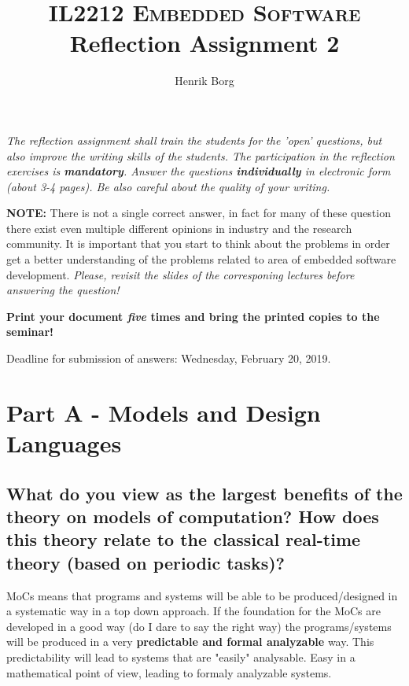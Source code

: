 \documentclass[10pt]{article}
\title{{\normalsize\textsc {IL2212 Embedded Software}} \\ Reflection Assignment 2}
\author{Henrik Borg}
\begin{document}
\maketitle
\thispagestyle{fancy} %

{\em The reflection assignment shall train the students for the 'open' questions, but also improve the writing skills of the students. The participation in the reflection exercises is \textbf{mandatory}. Answer the questions \textbf{individually} in electronic form (about 3-4 pages). Be also careful about the quality of your writing. }

\medskip

\noindent\textbf{NOTE:} There is not a single correct answer, in fact
for many of these question there exist even multiple different opinions
in industry and the research community. It is important that you start
to think about the problems in order get a better understanding of the
problems related to area of embedded software development. 
\emph{Please, revisit the slides of the corresponing lectures before answering the question!}

\medskip

\noindent\textbf{Print your document \emph{five} times and bring the printed copies to the seminar!}

\medskip

\noindent Deadline for submission of answers: Wednesday, February 20, 2019. 


\section{Part A - Models and Design Languages}

\subsection{What do you view as the largest benefits of the theory on
  models of computation? How does this theory relate to the classical real-time
  theory (based on periodic tasks)?}

MoCs means that programs and systems will be able to be produced/designed in a systematic way in a top down approach. If the foundation for the MoCs are developed in a good way (do I dare to say the right way) the programs/systems will be produced in a very \textbf{predictable and formal analyzable} way. This predictability will lead to systems that are "easily" analysable. Easy in a mathematical point of view, leading to formaly analyzable systems.
\end{document}
